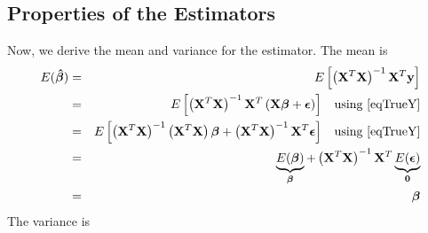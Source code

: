 \documentclass[11pt]{article}
\theoremstyle{remark}
\begin{document}
\subsection{Properties of the Estimators}
Now, we derive the mean and variance for the estimator. The mean is
\begin{eqnarray}
E(\boldsymbol{\hat{\beta}}) &=& E\left[  \left(\bold{X}^T\bold{X}\right)^{-1}\bold{X}^T\bold{y} \right]\nonumber\\
&=& E\left[  \left(\bold{X}^T\bold{X}\right)^{-1}\bold{X}^T\left(\bold{X}\boldsymbol{\beta} + \boldsymbol{\epsilon}\right) \right]\:\:\:\:\text{using \eqref{eqTrueY}}\nonumber\\
&=& E\left[  \left(\bold{X}^T\bold{X}\right)^{-1}\left(\bold{X}^T\bold{X}\right)\boldsymbol{\beta} + \left(\bold{X}^T\bold{X}\right)^{-1}\bold{X}^T\boldsymbol{\epsilon} \right]\:\:\:\:\text{using \eqref{eqTrueY}}\nonumber\\
&=& \underbrace{E(\boldsymbol{\beta})}_{\boldsymbol{\beta}}+ \left(\bold{X}^T\bold{X}\right)^{-1}\bold{X}^T\underbrace{E(\boldsymbol{\epsilon})}_{\bold{0}}\nonumber\\
&=& \boldsymbol{\beta} \label{MeanEstimatorBeta}
\end{eqnarray}
The variance is
\end{document}
